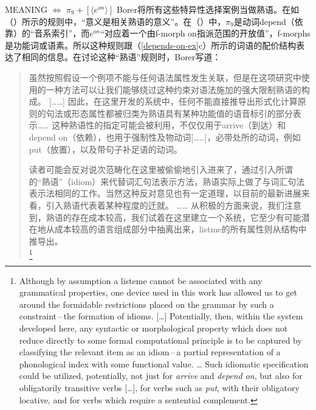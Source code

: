 \begin{exe}
\begin{xlist}[iv.]
\begin{exe}
\begin{xlist}[iv.]
\ea
MEANING $\Leftrightarrow$ $\pi_9 + [ \langle e^{on} \rangle ]$  
\z
Borer将所有这些特异性选择案例当做熟语。在如（）所示的规则中，“意义是相关熟语的意义”\citep[Vol.\ II，第27页]{Borer2005a-u}。在（）中，$\pi_9$是动词depend（依靠）的“音系索引”，而$e^{on}$“对应着一个由f-morph on指派范围的开放值”\citep[Vol.\ II, 第29页]{Borer2005a-u}，f-morphs是功能词或语素。所以这种规则跟（\ref{depends-on-ex}c）所示的词语的配价结构表达了相同的信息。在讨论这种“熟语”规则时，Borer写道：

\begin{quotation}
虽然按照假设一个例项不能与任何语法属性发生关联，但是在这项研究中使用的一种方法可以让我们能够绕过这种约束对语法施加的强大限制\cndash{}熟语的构成。 [……] 
因此，在这里开发的系统中，任何不能直接推导出形式化计算原则的句法或形态属性都被归类为熟语\cndash{}具有某种功能值的语音标引的部分表示…… 
这种熟语性的指定可能会被利用，不仅仅用于arrive（到达）和depend on（依赖），也用于强制性及物动词[……]，必带处所的动词，例如put（放置），以及带句子补足语的动词。

读者可能会反对说次范畴化在这里被偷偷地引入进来了，通过引入所谓的“熟语”（idiom）来代替词汇句法表示方法，熟语实际上做了与词汇句法表示法相同的工作。当然这种反对意见也有一定道理，以目前的最新进展来看，引入熟语代表着某种程度的迁就。
……  从积极的方面来说，我们注意到，熟语的存在成本较高，我们试着在这里建立一个系统，它至少有可能潜在地从成本较高的语言组成部分中抽离出来，listme的所有属性则从结构中推导出。
  \\ \citep[Vol. II，第354--355页]{Borer2005a-u}\footnote{%
Although by assumption a listeme cannot be associated with any grammatical properties, one device used in this work has allowed us to get around the formidable restrictions placed on the grammar by such a constraint\,--\,the formation of idioms.  [\ldots] 
Potentially, then, within the system developed here, any syntactic or morphological property which does not reduce directly to some formal computational principle is to be captured by classifying the relevant item as an idiom\,--\,a partial representation of a phonological index with some functional value. \ldots 
Such idiomatic specification could be utilized, potentially, not just for \emph{arrive} and \emph{depend on}, but also for obligatorily transitive verbs [\ldots], for verbs such as \emph{put}, with their obligatory locative, and for verbs which require a sentential complement.

}
\end{quotation}
\end{xlist}
\end{exe}
\end{xlist}
\end{exe}
